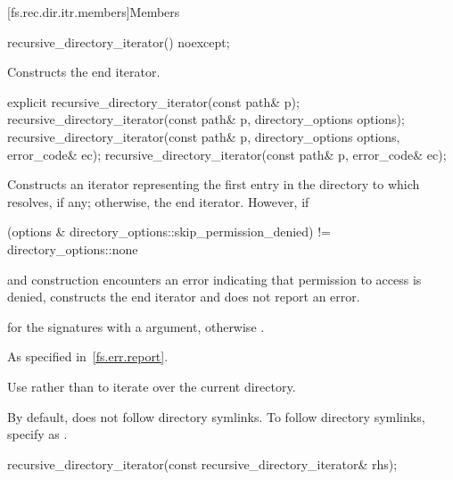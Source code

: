 [fs.rec.dir.itr.members]{Members}

%
\begin{itemdecl}
recursive_directory_iterator() noexcept;
\end{itemdecl}

\begin{itemdescr}
\pnum
\effects
Constructs the end iterator.
\end{itemdescr}

%
\begin{itemdecl}
explicit recursive_directory_iterator(const path& p);
recursive_directory_iterator(const path& p, directory_options options);
recursive_directory_iterator(const path& p, directory_options options, error_code& ec);
recursive_directory_iterator(const path& p, error_code& ec);
\end{itemdecl}

\begin{itemdescr}
\pnum
\effects
Constructs an iterator representing the first
entry in the directory to which  resolves, if any; otherwise, the end iterator.
However, if
\begin{codeblock}
(options & directory_options::skip_permission_denied) != directory_options::none
\end{codeblock}
and construction encounters an error indicating
that permission to access  is denied, constructs the end iterator
and does not report an error.

\pnum
\ensures
{} for the signatures with a
 argument, otherwise .

\pnum
\throws
As specified in~\ref{fs.err.report}.

\pnum
\begin{note}
Use 
rather than 
to iterate over the current directory.
\end{note}

\pnum
\begin{note}
By default,  does not
follow directory symlinks. To follow directory symlinks, specify  as
.
\end{note}
\end{itemdescr}

%
\begin{itemdecl}
recursive_directory_iterator(const recursive_directory_iterator& rhs);
\end{itemdecl}

